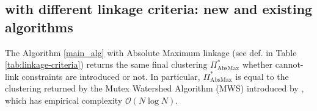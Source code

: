 \subsection{\algname{} with different linkage criteria: new and existing algorithms} \label{sec:alg_update_rules}


\begin{prop} 
The \algname{} Algorithm \ref{main_alg} with Absolute Maximum linkage (see def. in Table \ref{tab:linkage-criteria}) returns the same final clustering $\Pi^*_{\mathrm{AbsMax}}$ whether cannot-link constraints are introduced or not. In particular, $\Pi^*_{\mathrm{AbsMax}}$ is equal to the clustering returned by the Mutex Watershed Algorithm (MWS) introduced by \cite{wolf2018mutex}, which has empirical complexity $\mathcal{O}(N \log N)$. 
\end{prop}




